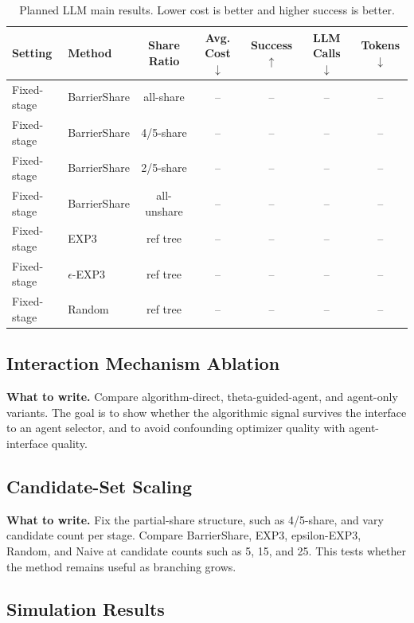 \documentclass{article}
\newcommand{\towrite}[1]{\noindent\textbf{What to write.} #1}
\begin{document}
\begin{table}[t]
    \centering
    \small
    \caption{Planned LLM main results. Lower cost is better and higher success is better.}
    \label{tab:llm_main}
    \begin{tabular}{llccccc}
        \toprule
        Setting & Method & Share Ratio & Avg. Cost $\downarrow$ & Success $\uparrow$ & LLM Calls $\downarrow$ & Tokens $\downarrow$ \\
        \midrule
        Fixed-stage & BarrierShare & all-share & -- & -- & -- & -- \\
        Fixed-stage & BarrierShare & 4/5-share & -- & -- & -- & -- \\
        Fixed-stage & BarrierShare & 2/5-share & -- & -- & -- & -- \\
        Fixed-stage & BarrierShare & all-unshare & -- & -- & -- & -- \\
        Fixed-stage & EXP3 & ref tree & -- & -- & -- & -- \\
        Fixed-stage & $\epsilon$-EXP3 & ref tree & -- & -- & -- & -- \\
        Fixed-stage & Random & ref tree & -- & -- & -- & -- \\
        \bottomrule
    \end{tabular}
\end{table}

\subsection{Interaction Mechanism Ablation}

\towrite{Compare algorithm-direct, theta-guided-agent, and agent-only variants. The goal is to show whether the algorithmic signal survives the interface to an agent selector, and to avoid confounding optimizer quality with agent-interface quality.}

\subsection{Candidate-Set Scaling}

\towrite{Fix the partial-share structure, such as 4/5-share, and vary candidate count per stage. Compare BarrierShare, EXP3, epsilon-EXP3, Random, and Naive at candidate counts such as 5, 15, and 25. This tests whether the method remains useful as branching grows.}

\subsection{Simulation Results}
\end{document}
